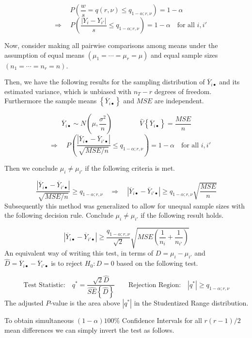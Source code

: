 \documentclass[
]{book}
\begin{document}
\[
P\left(\frac{w}{s}=q(r,\nu)\le q_{1-\alpha;r,\nu}\right)=1-\alpha
\] \[
\quad \Rightarrow \quad P\left(\frac{\left|Y_i-Y_{i'}\right|}{s}
\le q_{1-\alpha;r,\nu}\right)=1-\alpha \quad \mbox{for all } i,i'
\]

Now, consider making all pairwise comparisons among means under the
assumption of equal means \(\left(\mu_1=\cdots = \mu_r = \mu\right)\)
and equal sample sizes \(\left(n_1=\cdots = n_r=n\right)\).

Then, we have the following results for the sampling distribution of
\(\overline{Y}_{i\bullet}\) and its estimated variance, which is
unbiased with \(n_T-r\) degrees of freedom. Furthermore the sample means
\(\left\{\overline{Y}_{i\bullet}\right\}\) and \(MSE\) are independent.

\[
\overline{Y}_{i\bullet} \sim N\left(\mu,\frac{\sigma^2}{n}\right)
\qquad \qquad
\hat{V}\left\{\overline{Y}_{i\bullet}\right\}=\frac{MSE}{n}
\] \[
\quad \Rightarrow \quad 
P\left(\frac{\left|\overline{Y}_{i\bullet}-
\overline{Y}_{i'\bullet}\right|}{\sqrt{MSE/n}}
\le q_{1-\alpha;r,\nu}\right)=1-\alpha \quad \mbox{for all } i,i'
\]

Then we conclude \(\mu_i \ne \mu_{i'}\) if the following criteria is
met.

\[
\frac{\left|\overline{Y}_{i\bullet}-
\overline{Y}_{i'\bullet}\right|}{\sqrt{MSE/n}}
\ge q_{1-\alpha;r,\nu}
\quad \Rightarrow \quad
\left|\overline{Y}_{i\bullet}-
\overline{Y}_{i'\bullet}\right| 
\ge q_{1-\alpha;r,\nu}\sqrt{\frac{MSE}{n}}
\] Subsequently this method was generalized to allow for unequal sample
sizes with the following decision rule. Conclude \(\mu_i \ne \mu_{i'}\)
if the following result holds.

\[
\left|\overline{Y}_{i\bullet}-
\overline{Y}_{i'\bullet}\right| 
\ge \frac{q_{1-\alpha;r,\nu}}{\sqrt{2}}\sqrt{MSE
\left(\frac{1}{n_i}+\frac{1}{n_{i'}}\right)}
\] An equivalent way of writing this test, in terms of
\(D=\mu_i-\mu_{i'}\) and
\(\hat{D}=\overline{Y}_{i\bullet}-\overline{Y}_{i'\bullet}\) is to
reject \(H_0: D=0\) based on the following test.

\[
\mbox{Test Statistic:} \quad 
q^*=\frac{\sqrt{2}\hat{D}}{\hat{SE}\left\{\hat{D}\right\}} \qquad
\mbox{Rejection Region:} \quad \left|q^*\right| \ge
q_{1-\alpha;r,\nu}
\] The adjusted \(P\)-value is the area above \(\left|q^*\right|\) in
the Studentized Range distribution.

To obtain simultaneous \((1-\alpha)100\%\) Confidence Intervals for all
\(r(r-1)/2\) mean differences we can simply invert the test as follows.
\end{document}
